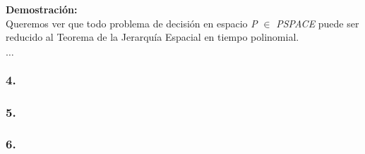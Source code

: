 \documentclass[12pt]{article}
\begin{document}
\noindent \textbf{Demostración: \\}
Queremos ver que todo problema de decisión en espacio \textit{P} $\in$ \textit{PSPACE} puede ser reducido al Teorema de la Jerarquía Espacial en tiempo polinomial.

$\dots$

\subsubsection*{4.}

\subsubsection*{5.}

\subsubsection*{6.}
\end{document}
